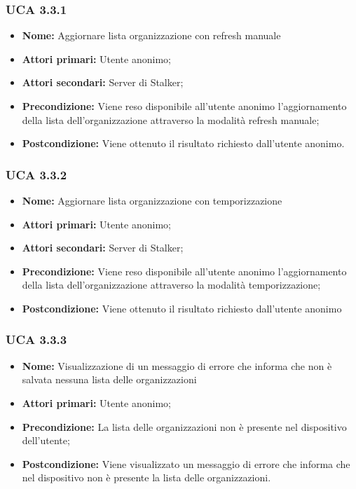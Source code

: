 \subsubsection{UCA 3.3.1 }%
\begin{itemize}
	\item \textbf{Nome:} Aggiornare lista organizzazione con refresh manuale
	\item \textbf{Attori primari:} Utente anonimo;
	\item \textbf{Attori secondari:} Server di Stalker;
	\item \textbf{Precondizione:} Viene reso disponibile all’utente anonimo l’aggiornamento della lista dell’organizzazione attraverso la modalità refresh manuale;
	\item \textbf{Postcondizione:} Viene ottenuto il risultato richiesto dall’utente anonimo.
	
\end{itemize}

\subsubsection{UCA 3.3.2}%
\begin{itemize}
	\item \textbf{Nome:} Aggiornare lista organizzazione con temporizzazione 
	\item \textbf{Attori primari:} Utente anonimo;
	\item \textbf{Attori secondari:} Server di Stalker;
	\item \textbf{Precondizione:} Viene reso disponibile all’utente anonimo l’aggiornamento della lista dell’organizzazione attraverso la modalità temporizzazione; 	
	\item \textbf{Postcondizione:} Viene ottenuto il risultato richiesto dall’utente anonimo
\end{itemize}

\subsubsection{UCA 3.3.3}%
\begin{itemize}
	\item \textbf{Nome:} Visualizzazione di un messaggio di errore che informa che non è salvata nessuna lista delle organizzazioni
	\item \textbf{Attori primari:} Utente anonimo;
	\item \textbf{Precondizione:} La lista delle organizzazioni non è presente nel dispositivo dell’utente;
	\item \textbf{Postcondizione:} Viene visualizzato un messaggio di errore che informa che nel dispositivo non è presente la lista delle organizzazioni.
\end{itemize}

